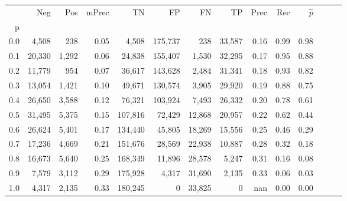 \begin{tabular}{rrrrrrrrrrrrrr}
\toprule
{} &     Neg &    Pos & mPrec &       TN &       FP &      FN &      TP &  Prec &   Rec & $\hat{p}$ \\
p   &         &        &       &          &          &         &         &       &       &           \\
\midrule
0.0 &   4,508 &    238 &  0.05 &    4,508 &  175,737 &     238 &  33,587 &  0.16 &  0.99 &      0.98 \\
0.1 &  20,330 &  1,292 &  0.06 &   24,838 &  155,407 &   1,530 &  32,295 &  0.17 &  0.95 &      0.88 \\
0.2 &  11,779 &    954 &  0.07 &   36,617 &  143,628 &   2,484 &  31,341 &  0.18 &  0.93 &      0.82 \\
0.3 &  13,054 &  1,421 &  0.10 &   49,671 &  130,574 &   3,905 &  29,920 &  0.19 &  0.88 &      0.75 \\
0.4 &  26,650 &  3,588 &  0.12 &   76,321 &  103,924 &   7,493 &  26,332 &  0.20 &  0.78 &      0.61 \\
0.5 &  31,495 &  5,375 &  0.15 &  107,816 &   72,429 &  12,868 &  20,957 &  0.22 &  0.62 &      0.44 \\
0.6 &  26,624 &  5,401 &  0.17 &  134,440 &   45,805 &  18,269 &  15,556 &  0.25 &  0.46 &      0.29 \\
0.7 &  17,236 &  4,669 &  0.21 &  151,676 &   28,569 &  22,938 &  10,887 &  0.28 &  0.32 &      0.18 \\
0.8 &  16,673 &  5,640 &  0.25 &  168,349 &   11,896 &  28,578 &   5,247 &  0.31 &  0.16 &      0.08 \\
0.9 &   7,579 &  3,112 &  0.29 &  175,928 &    4,317 &  31,690 &   2,135 &  0.33 &  0.06 &      0.03 \\
1.0 &   4,317 &  2,135 &  0.33 &  180,245 &        0 &  33,825 &       0 &   nan &  0.00 &      0.00 \\
\bottomrule
\end{tabular}
